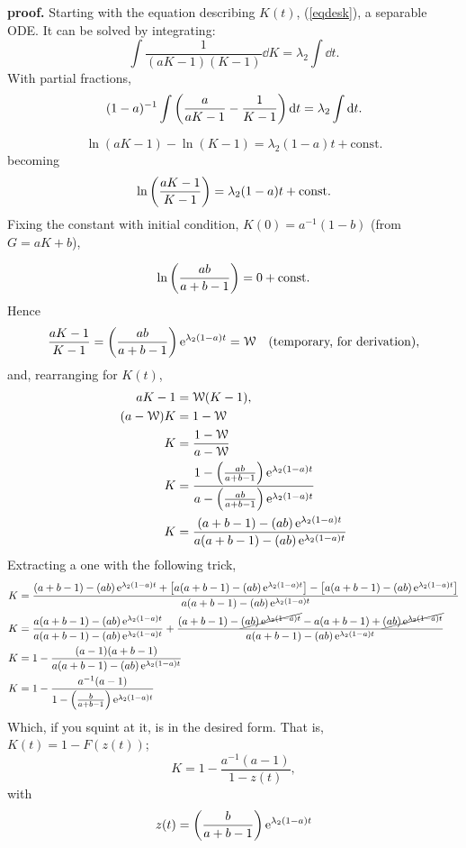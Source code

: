 \noindent
\textbf{proof.} Starting with the equation describing $K(t)$, (\ref{eqdesk}), a separable ODE. It can be solved by integrating:
$$\int\frac{1}{(aK - 1)(K-1)}\dd K = \lambda_2\int\dd t.$$
With partial fractions,
$$(1-a)^{-1}\int\left(\frac{a}{aK-1} - \frac{1}{K-1}\right){\rm d} t = \lambda_2\int{\rm d} t.$$
 
$${\ln(aK-1) - \ln(K-1)} = \lambda_2 (1-a) t + \text{const.}$$
becoming
$$\ln\left(\frac{aK-1}{K-1}\right) = \lambda_2 (1-a) t + \text{const.} $$
Fixing the constant with initial condition, $K(0) = a^{-1}(1-b)$ (from $G = aK +b$),

$$\ln\left(\frac{ab}{a+b - 1}\right)  = 0 + \text{const.}$$
Hence
$${\frac{aK-1}{K-1}} =  \left(\frac{ab}{a+b - 1}\right)   {\rm e}^{ \lambda_2 (1-a) t } = \mathcal{W} \quad\text{(temporary, for derivation)},$$
and, rearranging for $K(t)$,
\begin{align*}
aK -1 &= \mathcal{W} (K-1), \\
(a - \mathcal{W})K &= 1 - \mathcal{W}\\
K &= \frac{1-\mathcal{W}}{a - \mathcal{W}}\\
K &= \frac{1 - \left(\frac{ab}{a+b-1}\right) {\rm e}^{\lambda_2 (1-a) t} }{a - \left(\frac{ab}{a+b-1}\right) {\rm e}^{\lambda_2 (1-a) t} }\\
K &= \frac{(a+b-1) - \left({ab}\right) {\rm e}^{\lambda_2 (1-a) t} }{a(a+b-1) - \left({ab}\right) {\rm e}^{\lambda_2 (1-a) t} }
\end{align*}
Extracting a one with the following trick,
\begin{align*}
K &= \frac{(a+b-1) - \left({ab}\right) {\rm e}^{\lambda_2 (1-a) t}   + \left[  a(a+b-1) - \left({ab}\right) {\rm e}^{\lambda_2 (1-a) t}\right] - \left[ a(a+b-1) - \left({ab}\right) {\rm e}^{\lambda_2 (1-a) t}  \right] }{a(a+b-1) - \left({ab}\right) {\rm e}^{\lambda_2 (1-a) t} }\\
K &= \frac{a(a+b-1) - \left({ab}\right) {\rm e}^{\lambda_2 (1-a) t} }{a(a+b-1) - \left({ab}\right) {\rm e}^{\lambda_2 (1-a) t} }  +  \frac{(a+b-1) - \cancel{\left({ab}\right) {\rm e}^{\lambda_2 (1-a) t}}  - {a(a+b-1) + \cancel{\left({ab}\right) {\rm e}^{\lambda_2 (1-a) t} } } }{a(a+b-1) - \left({ab}\right) {\rm e}^{\lambda_2 (1-a) t} }\\
K &=  1 - \frac{(a-1)(a+b-1)}{a(a+b-1) - \left({ab}\right) {\rm e}^{\lambda_2 (1-a) t}}\\
K &=  1 - \frac{a^{-1}(a-1)}{1 -  \left(\frac{b}{a+b-1}\right) {\rm e}^{\lambda_2 (1-a) t}}
\end{align*}
Which, if you squint at it, is in the desired form. That is, $K(t) = 1 - F(z(t))$;
$$K = 1 - \frac{a^{-1}(a-1)}{1-z(t)},$$
with 
\begin{equation}
\label{ansatseed}
z(t) = \left(\frac{b}{a+b-1}\right) {\rm e}^{\lambda_2 (1-a) t}
\end{equation}

